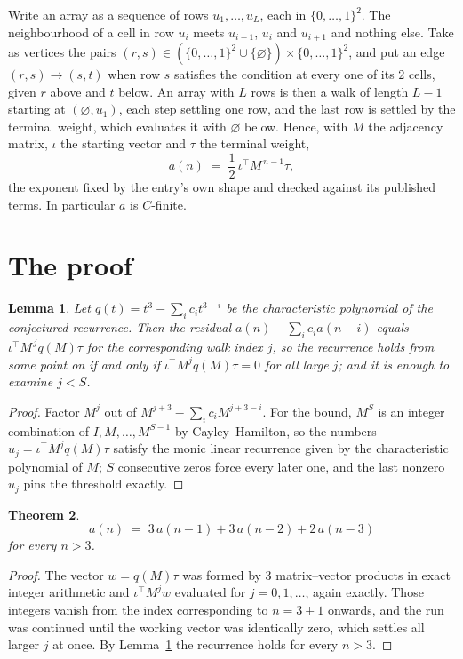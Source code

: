 \documentclass[11pt,a4paper]{article}
\theoremstyle{plain}
\newtheorem{theorem}{Theorem}
\newtheorem{lemma}[theorem]{Lemma}
\theoremstyle{definition}
\begin{document}
Write an array as a sequence of rows $u_1,\dots,u_L$, each in
$\{0,\dots,1\}^{2}$. The neighbourhood of a cell in row $u_i$ meets $u_{i-1}$,
$u_i$ and $u_{i+1}$ and nothing else. Take as vertices the pairs
$(r,s)\in(\{0,\dots,1\}^{2}\cup\{\varnothing\})\times\{0,\dots,1\}^{2}$,
and put an edge $(r,s)\to(s,t)$ when row $s$ satisfies the condition at every one of its
$2$ cells, given $r$ above and $t$ below. An array with $L$ rows is then a walk of length
$L-1$ starting at $(\varnothing,u_1)$, each step settling one row, and the last row is
settled by the terminal weight, which evaluates it with $\varnothing$ below. Hence,
with $M$ the adjacency matrix, $\iota$ the starting vector and $\tau$ the terminal weight,
\[
a(n)\;=\;\frac{1}{2}\,\iota^{\!\top}M^{\,n-1}\tau ,
\]
the exponent fixed by the entry's own shape and checked against its published terms. In
particular $a$ is $C$-finite.

\section{The proof}

\begin{lemma}\label{lem:crit}
Let $q(t)=t^{3}-\sum_i c_it^{3-i}$ be the characteristic polynomial of the
conjectured recurrence. Then the residual $a(n)-\sum_ic_ia(n-i)$ equals
$\iota^{\!\top}M^{\,j}q(M)\tau$ for the corresponding walk index $j$, so the
recurrence holds from some point on if and only if $\iota^{\!\top}M^{j}q(M)\tau=0$ for all
large $j$; and it is enough to examine $j<S$.
\end{lemma}

\begin{proof}
Factor $M^{j}$ out of $M^{j+3}-\sum_ic_iM^{j+3-i}$. For the bound, $M^{S}$
is an integer combination of $I,M,\dots,M^{S-1}$ by Cayley--Hamilton, so the numbers
$u_j=\iota^{\!\top}M^{j}q(M)\tau$ satisfy the monic linear recurrence given by the
characteristic polynomial of $M$; $S$ consecutive zeros force every later one, and the last
nonzero $u_j$ pins the threshold exactly.
\end{proof}

\begin{theorem}
\[
a(n)\;=\;3\,a(n-1) + 3\,a(n-2) + 2\,a(n-3)
\]
for every $n>3$.
\end{theorem}

\begin{proof}
The vector $w=q(M)\tau$ was formed by $3$ matrix--vector products in exact integer
arithmetic and $\iota^{\!\top}M^{j}w$ evaluated for $j=0,1,\dots$, again exactly. Those
integers vanish from the index corresponding to $n=3+1$ onwards, and the run was
continued until the working vector was identically zero, which settles all larger $j$ at once.
By Lemma~\ref{lem:crit} the recurrence holds for every $n>3$.
\end{proof}
\end{document}
